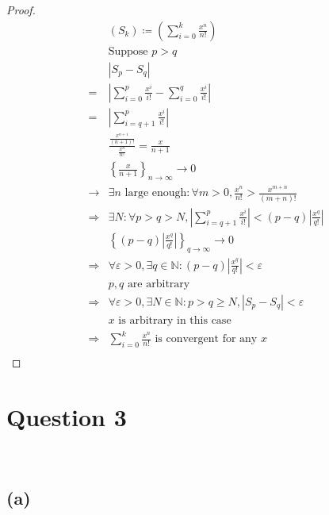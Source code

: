 \documentclass{article}
\begin{document}
\begin{proof}
    \begin{align*}
        &(S_k)\coloneqq\left(\sum_{i=0}^{k}\frac{x^n}{n!}\right)\\
        &\text{Suppose }p>q\\
        &\left|S_p-S_q\right|\\
        =&\left|\sum_{i=0}^{p}\frac{x^i}{i!}-\sum_{i=0}^{q}\frac{x^i}{i!}\right|\\
        =&\left|\sum_{i=q+1}^{p}\frac{x^i}{i!}\right|\\
        &\frac{\frac{x^{n+1}}{(n+1)!}}{\frac{x^n}{n!}}=\frac{x}{n+1}\\
        &\left\{\frac{x}{n+1}\right\}_{n\to\infty}\to0\\
        \rightarrow&\exists n\text{ large enough}:\forall m>0,\frac{x^n}{n!}>\frac{x^{m+n}}{(m+n)!}\\
        \Rightarrow&\exists N:\forall p>q>N,\left|\sum_{i=q+1}^{p}\frac{x^i}{i!}\right|<(p-q)\left|\frac{x^q}{q!}\right|\\
        &\left\{(p-q)\left|\frac{x^q}{q!}\right|\right\}_{q\to\infty}\to0\\
        \Rightarrow&\forall \varepsilon>0,\exists q\in\mathbb{N}:(p-q)\left|\frac{x^q}{q!}\right|<\varepsilon\\
        &p,q\text{ are arbitrary}\\
        \Rightarrow&\forall \varepsilon>0,\exists N\in\mathbb{N}:p>q\geqslant N,|S_p-S_q|<\varepsilon\\
        &x\text{ is arbitrary in this case}\\
        \Rightarrow&\sum_{i=0}^{k}\frac{x^n}{n!}\text{ is convergent for any }x\\
    \end{align*}
\end{proof}

\newpage

\section*{Question 3}

~

\subsection*{(a)}

~

\end{document}
